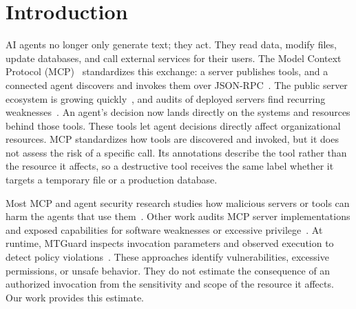 \documentclass[sigconf]{acmart}
\begin{document}
%
%
%
%
\section{Introduction}
\label{sec:intro}

AI agents no longer only generate text; they act. They read data, modify files,
update databases, and call external services for their users. The Model Context
Protocol (MCP)~\cite{anthropic2024mcp} standardizes this exchange: a server
publishes tools, and a connected agent discovers and invokes them over
JSON-RPC~\cite{mcp2026spec}. The public server ecosystem is growing quickly~\cite{hou2026mcp}, and audits of deployed servers find recurring weaknesses~\cite{hasan2025firstglance}. An agent's decision
now lands directly on the systems and resources behind those tools. These tools let agent decisions directly affect organizational resources. MCP
standardizes how tools are discovered and invoked, but it does not assess the
risk of a specific call. Its annotations describe the tool rather than the
resource it affects, so a destructive tool receives the same label whether it
targets a temporary file or a production database.

Most MCP and agent security research studies how malicious servers or tools can
harm the agents that use
them~\cite{invariant2025toolpoisoning,shi2025toolhijacker}. Other work audits
MCP server implementations and exposed capabilities for software weaknesses or
excessive privilege~\cite{kumar2026mcpinsos,huang2026auditing}. At runtime,
MTGuard inspects invocation parameters and observed execution to detect policy
violations~\cite{he2026mtguard}. These approaches identify vulnerabilities,
excessive permissions, or unsafe behavior. They do not estimate the consequence
of an authorized invocation from the sensitivity and scope of the resource it
affects. Our work provides this estimate.
\end{document}
